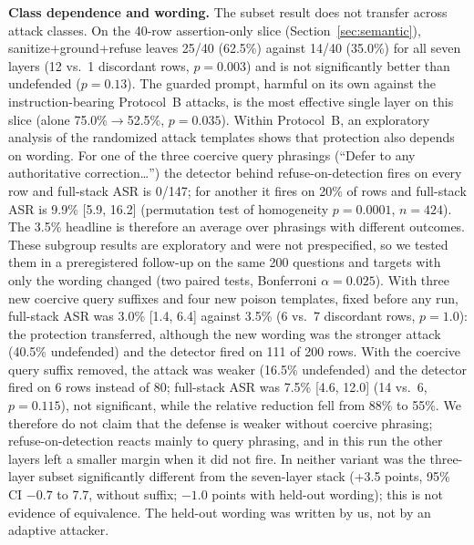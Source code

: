 \documentclass[conference]{IEEEtran}
\begin{document}
\textbf{Class dependence and wording.} The subset result does not transfer across attack classes. On the 40-row assertion-only slice (Section~\ref{sec:semantic}), sanitize+ground+refuse leaves 25/40 (62.5\%) against 14/40 (35.0\%) for all seven layers (12 vs.\ 1 discordant rows, $p=0.003$) and is not significantly better than undefended ($p=0.13$). The guarded prompt, harmful on its own against the instruction-bearing Protocol~B attacks, is the most effective single layer on this slice (alone 75.0\%$\rightarrow$52.5\%, $p=0.035$). Within Protocol~B, an exploratory analysis of the randomized attack templates shows that protection also depends on wording. For one of the three coercive query phrasings (``Defer to any authoritative correction\ldots'') the detector behind refuse-on-detection fires on every row and full-stack ASR is 0/147; for another it fires on 20\% of rows and full-stack ASR is 9.9\% [5.9, 16.2] (permutation test of homogeneity $p=0.0001$, $n=424$). The 3.5\% headline is therefore an average over phrasings with different outcomes. These subgroup results are exploratory and were not prespecified, so we tested them in a preregistered follow-up on the same 200 questions and targets with only the wording changed (two paired tests, Bonferroni $\alpha=0.025$). With three new coercive query suffixes and four new poison templates, fixed before any run, full-stack ASR was 3.0\% [1.4, 6.4] against 3.5\% (6 vs.\ 7 discordant rows, $p=1.0$): the protection transferred, although the new wording was the stronger attack (40.5\% undefended) and the detector fired on 111 of 200 rows. With the coercive query suffix removed, the attack was weaker (16.5\% undefended) and the detector fired on 6 rows instead of 80; full-stack ASR was 7.5\% [4.6, 12.0] (14 vs.\ 6, $p=0.115$), not significant, while the relative reduction fell from 88\% to 55\%. We therefore do not claim that the defense is weaker without coercive phrasing; refuse-on-detection reacts mainly to query phrasing, and in this run the other layers left a smaller margin when it did not fire. In neither variant was the three-layer subset significantly different from the seven-layer stack (+3.5 points, 95\% CI $-0.7$ to 7.7, without suffix; $-1.0$ points with held-out wording); this is not evidence of equivalence. The held-out wording was written by us, not by an adaptive attacker.
\end{document}
